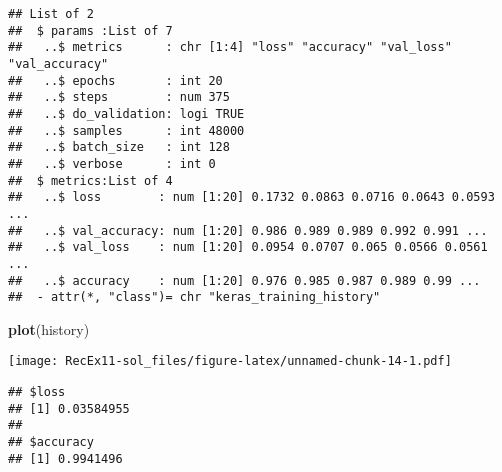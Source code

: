 \documentclass[]{article}
\newenvironment{Shaded}{\begin{snugshade}}{\end{snugshade}}
\newcommand{\KeywordTok}[1]{\textcolor[rgb]{0.13,0.29,0.53}{\textbf{#1}}}
\newcommand{\NormalTok}[1]{#1}
\newcommand{\OperatorTok}[1]{\textcolor[rgb]{0.81,0.36,0.00}{\textbf{#1}}}
\newcommand{\StringTok}[1]{\textcolor[rgb]{0.31,0.60,0.02}{#1}}
\begin{document}
\begin{verbatim}
## List of 2
##  $ params :List of 7
##   ..$ metrics      : chr [1:4] "loss" "accuracy" "val_loss" "val_accuracy"
##   ..$ epochs       : int 20
##   ..$ steps        : num 375
##   ..$ do_validation: logi TRUE
##   ..$ samples      : int 48000
##   ..$ batch_size   : int 128
##   ..$ verbose      : int 0
##  $ metrics:List of 4
##   ..$ loss        : num [1:20] 0.1732 0.0863 0.0716 0.0643 0.0593 ...
##   ..$ val_accuracy: num [1:20] 0.986 0.989 0.989 0.992 0.991 ...
##   ..$ val_loss    : num [1:20] 0.0954 0.0707 0.065 0.0566 0.0561 ...
##   ..$ accuracy    : num [1:20] 0.976 0.985 0.987 0.989 0.99 ...
##  - attr(*, "class")= chr "keras_training_history"
\end{verbatim}

\begin{Shaded}
\begin{Highlighting}[]
\KeywordTok{plot}\NormalTok{(history)}
\end{Highlighting}
\end{Shaded}

\texttt{[image: RecEx11-sol\_files/figure-latex/unnamed-chunk-14-1.pdf]}

\begin{Shaded}
\end{Shaded}

\begin{verbatim}
## $loss
## [1] 0.03584955
## 
## $accuracy
## [1] 0.9941496
\end{verbatim}
\end{document}
